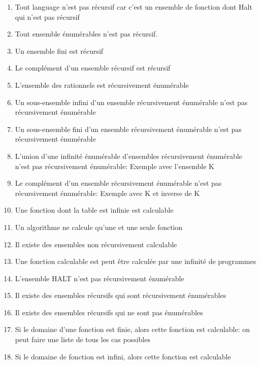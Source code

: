 \documentclass{report}
\begin{document}
\begin{enumerate}
\item Tout language n'est pas récursif car c'est un ensemble de fonction dont Halt qui n'est pas récursif
\item Tout ensemble énumérables n'est pas récursif.
\item Un ensemble fini est récursif
\item Le complément d'un ensemble récursif est récursif
\item L'ensemble des rationnels est récursivement énumérable
\item Un sous-ensemble infini d'un ensemble récursivement énumérable n'est pas récursivement énumérable
\item Un sous-ensemble fini d'un ensemble récursivement énumérable n'est pas récursivement énumérable
\item L’union d’une infinité énumérable d’ensembles récursivement énumérable n'est pas récursivement énumérable: Exemple avec l'ensemble K
\item Le complément d’un ensemble récursivement énumérable n'est  pas récursivement énumérable: Exemple avec K et inverse de K
\item Une fonction dont la table est infinie est calculable
\item Un algorithme ne calcule qu'une et une seule fonction
\item Il existe des ensembles non récursivement calculable
\item Une fonction calculable est peut être calculée par une infinité de programmes
\item L'ensemble HALT n'est pas récursivement énumérable
\item Il existe des ensembles récursifs qui sont récursivement énumérables
\item Il existe des ensembles récursifs qui ne sont pas énumérables
\item Si le domaine d'une fonction est finie, alors cette fonction est calculable: on peut faire une liste de tous les cas possibles
\item Si le domaine de fonction est infini, alors cette fonction est calculable
\end{enumerate}
\end{document}
